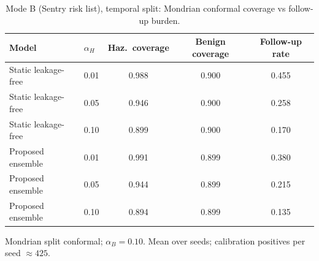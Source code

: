 \begin{table}[t]
\centering
\small
\caption{Mode B (Sentry risk list), temporal split: Mondrian conformal coverage vs follow-up burden.}
\label{tab:conf_sentry_temporal}
\begin{tabular}{llccc}
\toprule
Model & $\alpha_H$ & Haz.\ coverage & Benign coverage & Follow-up rate \\
\midrule
Static leakage-free & 0.01 & 0.988 & 0.900 & 0.455 \\
Static leakage-free & 0.05 & 0.946 & 0.900 & 0.258 \\
Static leakage-free & 0.10 & 0.899 & 0.900 & 0.170 \\
\midrule
Proposed ensemble & 0.01 & 0.991 & 0.899 & 0.380 \\
Proposed ensemble & 0.05 & 0.944 & 0.899 & 0.215 \\
Proposed ensemble & 0.10 & 0.894 & 0.899 & 0.135 \\
\bottomrule
\end{tabular}
\par\vspace{2pt}\footnotesize Mondrian split conformal; $\alpha_B=0.10$. Mean over seeds; calibration positives per seed $\approx 425$.
\end{table}
